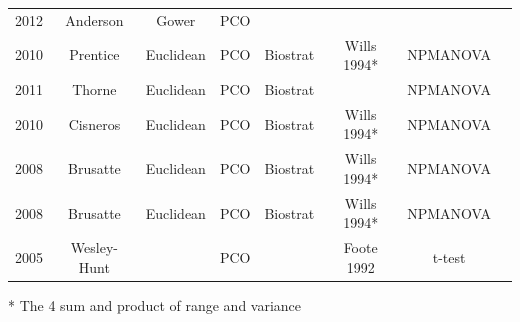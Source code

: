 \documentclass[12pt,letterpaper]{article}
\begin{document}
\begin{table}[ht]
\begin{tabular}{cccccccc}
    2012 & Anderson    & Gower     & PCO        &            &             &            & \citep{anderson2012using} \\
    2010 & Prentice    & Euclidean & PCO        & Biostrat   & Wills 1994* & NPMANOVA   & \citep{prentice2011} \\
    2011 & Thorne      & Euclidean & PCO        & Biostrat   &             & NPMANOVA   & \citep{thorneresetting2011} \\
    2010 & Cisneros    & Euclidean & PCO        & Biostrat   & Wills 1994* & NPMANOVA   & \citep{cisneros2010} \\
    2008 & Brusatte    & Euclidean & PCO        & Biostrat   & Wills 1994* & NPMANOVA   & \citep{brusatte50} \\
    2008 & Brusatte    & Euclidean & PCO        & Biostrat   & Wills 1994* & NPMANOVA   & \citep{Brusatte12092008} \\
    2005 & Wesley-Hunt &           & PCO        &            & Foote 1992  & t-test     & \citep{Wesley-Hunt2005} \\
  \hline
\end{tabular}
\end{table}
* The 4 sum and product of range and variance
\end{document}

